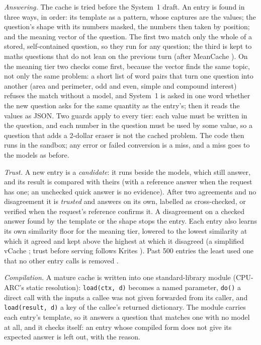 \emph{Answering.} The cache is tried before the System~1 draft. An entry is
found in three ways, in order: its template as a pattern, whose captures are the
values; the question's shape with its numbers masked, the numbers then taken
by position; and the meaning vector of the question. The first two match only the whole of
a stored, self-contained question, so they run for any question; the third is
kept to maths questions that do not lean on the previous turn (after MeanCache
\cite{gill2025meancache}). On the meaning tier two checks come first, because the vector finds the same topic, not only the same
problem: a short list of word pairs that turn one question into another
(area and perimeter, odd and even, simple and compound interest) refuses the
match without a model, and System~1 is asked in one word whether the new
question asks for the same quantity as the entry's; then it reads the values
as JSON. Two guards apply to every tier: each value must be written in the
question, and each number in the question must be used by some value, so a
question that adds a 2-dollar eraser is not the cached problem. The code then
runs in the sandbox; any error or failed conversion is a miss, and a miss goes
to the models as before.

\emph{Trust.} A new entry is a \emph{candidate}: it runs beside the models,
which still answer, and its result is compared with theirs (with a reference
answer when the request has one; an unchecked quick answer is no evidence).
After two agreements and no disagreement it is \emph{trusted} and answers on
its own, labelled as cross-checked, or verified when the request's reference
confirms it. A disagreement on a checked answer found by the template or the
shape stops the entry. Each entry also learns its own similarity floor for the
meaning tier, lowered to the lowest similarity at which it agreed and kept
above the highest at which it disagreed (a simplified vCache
\cite{schroeder2026vcache}; trust before serving follows Krites
\cite{singh2026krites}). Past 500 entries the least used one that no other
entry calls is removed \cite{kulkarni2026eviction}.

\emph{Compilation.} A mature cache is written into one standard-library
module (CPU-ARC's static resolution): \texttt{load(ctx, d)} becomes a named
parameter, \texttt{do()} a direct call with the inputs a callee was not given
forwarded from its caller, and \texttt{load(result, d)} a key of the callee's
returned dictionary. The module carries each entry's template, so it answers a
question that matches one with no model at all, and it checks itself: an entry
whose compiled form does not give its expected answer is left out, with the
reason.
